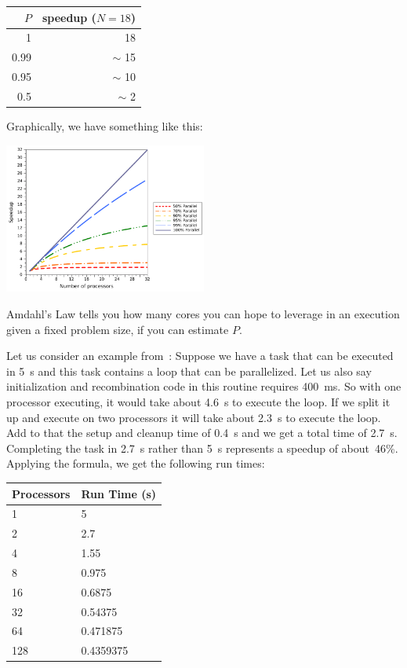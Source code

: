 \documentclass[a4paper]{report}
\begin{document}
\begin{center}
\begin{tabular}{r|r}
$P$ & speedup ($N=18$) \\ \hline
1 & 18 \\
0.99 & $\sim$ 15 \\
0.95 & $\sim$ 10 \\
0.5 & $\sim$ 2
\end{tabular}
\end{center}
Graphically, we have something like this:
\begin{center}
  \includegraphics[width=0.5\textwidth]{images/parallel-scaling}
\end{center}


Amdahl's Law tells you how many cores you can hope to leverage in an
execution given a fixed problem size, if you can estimate $P$.

Let us consider an example from~\cite{mte241}: Suppose we have a task that can be executed in 5~s and this task contains a loop that can be parallelized. Let us also say initialization and recombination code in this routine requires 400~ms. So with one processor executing, it would take about 4.6~s to execute the loop. If we split it up and execute on two processors it will take about 2.3~s to execute the loop. Add to that the setup and cleanup time of 0.4~s and we get a total time of 2.7~s. Completing the task in 2.7~s rather than 5~s represents a speedup of about~46\%. Applying the formula, we get the following run times:

\begin{center}
	\begin{tabular}{l|l}
	\textbf{Processors} & \textbf{Run Time (s)} \\ \hline
	1 & 5\\
	2 & 2.7\\
	4 & 1.55\\
	8 & 0.975\\
	16 & 0.6875 \\
	32 & 0.54375 \\
	64 & 0.471875 \\
	128 & 0.4359375\\
	\end{tabular}
\end{center}
\end{document}
